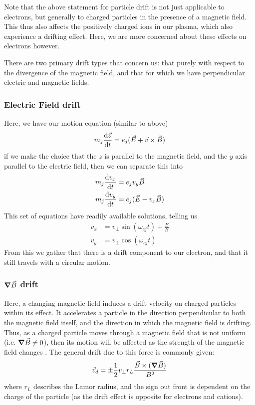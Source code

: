 \begin{remark}
    Note that the above statement for particle drift is not just applicable to electrons, but generally to charged particles 
    in the presence of a magnetic field. This thus also affects the positively charged ions in our plasma, which 
    also experience a drifting effect. Here, we are more concerned about these effects on electrons however.
\end{remark}

There are two primary drift types that concern us: that purely with respect to the divergence of the magnetic field, 
and that for which we have perpendicular electric and magnetic fields. 

\subsubsection{Electric Field drift}
Here, we have our motion equation (similar to above)
$$m_j \dv{\vec{v}}{t} = e_j (\vec{E} + \vec{v} \times \vec{B})$$
if we make the choice that the $z$ is parallel to the magnetic field, and the $y$ axis parallel to the electric field, then 
we can separate this into
\begin{align*}
    m_j \dv{v_x}{t} &= e_j v_y \vec{B} \\
    m_j \dv{v_y}{t} &= e_j (\vec{E} - v_x \vec{B})
\end{align*}
This set of equations have readily available solutions, telling us
\begin{align*}
    v_x &= v_{\perp} \sin (\omega_{cj} t) + \frac{E}{B} \\
    v_y &= v_{\perp} \cos (\omega_{cj} t)
\end{align*}
From this we gather that there is a drift component to our electron, and that it still travels with a circular motion.

\subsubsection{$\grad \vec{B}$ drift}
Here, a changing magnetic field induces a drift velocity on charged particles within its effect. It accelerates a particle 
in the direction perpendicular to both the magnetic field itself, and the direction in which the magnetic field is drifting.
Thus, as a charged particle moves through a magnetic field that is not uniform (i.e. $\grad \vec{B} \ne 0$), then 
its motion will be affected as the strength of the magnetic field changes \cite{howard-plasma-physics}. The general 
drift due to this force is commonly given:
\begin{equation*}
    \vec{v}_d = \pm\frac{1}{2} v_{\perp} r_L \frac{\vec{B} \times (\grad \vec{B})}{B^2}
\end{equation*}
where $r_L$ describes the Lamor radius, and the sign out front is dependent on the charge of the particle (as the 
drift effect is opposite for electrons and cations).

